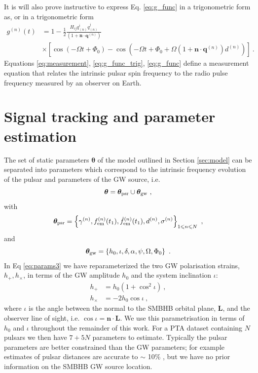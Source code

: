 \documentclass[fleqn,usenatbib,useAMS]{mnras}
\begin{document}
It is will also prove instructive to express Eq. \ref{eq:g_func} in a trigonometric form as,
or in a trigonometric form 
\begin{align}
	g^{(n)}(t) &= 1 - \frac{1}{2} \frac{ H_{ij}q^i_{(n)} q^j_{(n)} }{(1 + \boldsymbol{n}\cdot \boldsymbol{q}^{(n)}) } \nonumber \\
	& \times \left[ \cos(-\Omega t +\Phi_0) - \cos \left(-\Omega t +\Phi_0 + \Omega \left(1 + \boldsymbol{n}\cdot \boldsymbol{q}^{(n)} \right)  d^{(n)} \right) \right] \ .
	\label{eq:g_func_trig}
\end{align}
Equations \ref{eq:measurement}, \ref{eq:g_func_trig}, \ref{eq:g_func}  define a measurement equation that relates the intrinsic pulsar spin frequency to the radio pulse frequency measured by an observer on Earth. 

\section{Signal tracking and parameter estimation} \label{sec:detect}
The set of static parameters $\boldsymbol{\theta}$ of the model outlined in Section \ref{sec:model} can be separated into parameters which correspond to the intrinsic frequency evolution of the pulsar and parameters of the GW source, i.e. 
\begin{equation}
	\boldsymbol{\theta} =  \boldsymbol{\theta}_{\rm psr} \cup \boldsymbol{\theta}_{\rm gw} \ , \label{eq:params1}
\end{equation}
with
\begin{equation}
	\boldsymbol{\theta}_{\rm psr} = \left \{ \gamma^{(n)}, f_{\rm em}^{(n)}(t_1),\dot{f}_{\rm em}^{(n)}(t_1),d^{(n)},\sigma^{(n)}\right\}_{1\leq n \leq N} \ ,
\end{equation}
and
\begin{equation}
	\boldsymbol{\theta}_{\rm gw} = \left \{h_0, \iota, \delta, \alpha, \psi, \Omega, \Phi_0 \right \} \ .  \label{eq:params3}
\end{equation}
In Eq \ref{eq:params3} we have reparameterized the two GW polarisation strains, $h_{+}, h_{\times}$, in terms of the GW amplitude $h_0$ and the system inclination $\iota$:
\begin{align}
	h_+ &= h_0(1 + \cos^2 \iota) 	\label{eq:hphx} \ ,\\
	h_{\times} &= -2h_0\cos \iota 	\label{eq:hphx2} \ , 
\end{align}
where $\iota$ is the angle between the normal to the SMBHB orbital plane, $\boldsymbol{L}$, and the observer line of sight, i.e. $\cos \iota = \boldsymbol{n} \cdot \boldsymbol{L}$. We use this parametrisation in terms of $h_0$ and $\iota$ throughout the remainder of this work. For a PTA dataset containing $N$ pulsars we then have $7 + 5N$ parameters to estimate. Typically the pulsar parameters are better constrained than the GW parameters; for example estimates of pulsar distances are accurate to $\sim$ 10$\%$ \citep{Cordes2002astro.ph..7156C, Verbiest2012ApJ...755...39V, Desvignes2016,Yao2017}, but we have no prior information on the SMBHB GW source location.  \newline 
\end{document}
